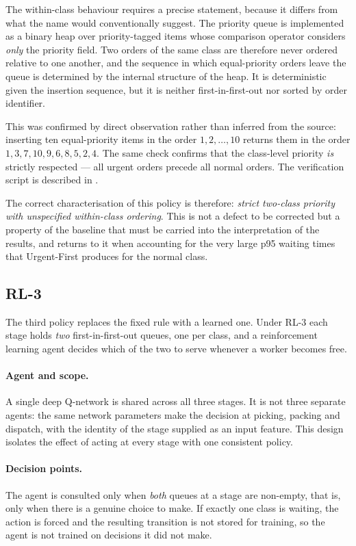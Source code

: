 The within-class behaviour requires a precise statement, because it differs from what the name
would conventionally suggest. The priority queue is implemented as a binary heap over
priority-tagged items whose comparison operator considers \emph{only} the priority field. Two
orders of the same class are therefore never ordered relative to one another, and the sequence
in which equal-priority orders leave the queue is determined by the internal structure of the
heap. It is deterministic given the insertion sequence, but it is neither first-in-first-out
nor sorted by order identifier.

This was confirmed by direct observation rather than inferred from the source: inserting ten
equal-priority items in the order \(1,2,\dots,10\) returns them in the order
\(1, 3, 7, 10, 9, 6, 8, 5, 2, 4\). The same check confirms that the class-level priority
\emph{is} strictly respected --- all urgent orders precede all normal orders. The verification
script is described in .

The correct characterisation of this policy is therefore: \emph{strict two-class priority with
unspecified within-class ordering}. This is not a defect to be corrected but a property of the
baseline that must be carried into the interpretation of the results, and
 returns to it when accounting for the very large p95 waiting times that
Urgent-First produces for the normal class.

\subsection{RL-3}
\label{sec:rl3}

The third policy replaces the fixed rule with a learned one. Under RL-3 each stage holds
\emph{two} first-in-first-out queues, one per class, and a reinforcement learning agent decides
which of the two to serve whenever a worker becomes free.

\paragraph{Agent and scope.} A single deep Q-network \citep{mnih2015} is shared across all
three stages. It is not three separate agents: the same network parameters make the decision at
picking, packing and dispatch, with the identity of the stage supplied as an input feature.
This design isolates the effect of acting at every stage with one consistent policy.

\paragraph{Decision points.} The agent is consulted only when \emph{both} queues at a stage are
non-empty, that is, only when there is a genuine choice to make. If exactly one class is
waiting, the action is forced and the resulting transition is not stored for training, so the
agent is not trained on decisions it did not make.

